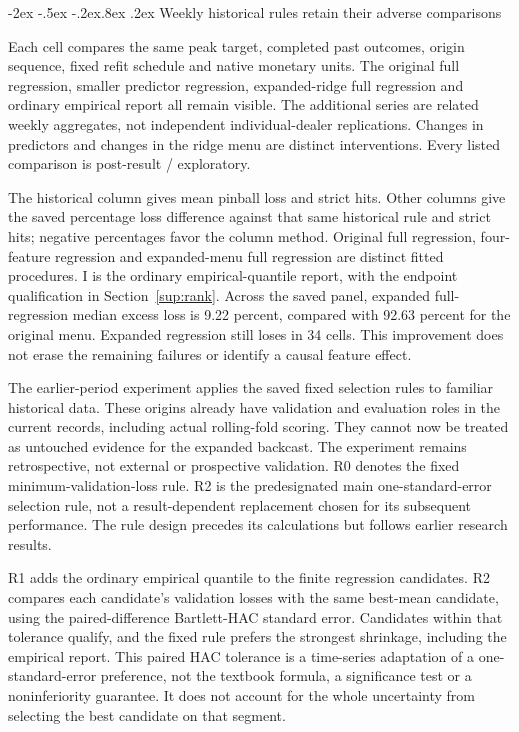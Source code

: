 \documentclass[12pt,a4paper]{article}
\makeatletter
\renewcommand\section{\@startsection{section}{1}{\z@}%
  {-2ex \@plus -.5ex \@minus -.2ex}{.8ex \@plus .2ex}%
  {\normalfont\large\bfseries}}
\makeatother
\begin{document}
\FloatBarrier


\section{Weekly historical rules retain their adverse comparisons}\label{sup:panel}\label{sup:panel-second}\label{sup:panel-levy}\label{sup:selection}\label{sup:selection-failures}

Each cell compares the same peak target, completed past outcomes,
origin sequence, fixed refit schedule and native monetary units. The original
full regression, smaller predictor regression, expanded-ridge full regression
and ordinary empirical report all remain visible. The additional series are
related weekly aggregates, not independent individual-dealer replications.
Changes in predictors and changes in the ridge menu are distinct interventions.
Every listed comparison is post-result / exploratory.

The historical column gives mean pinball loss and strict hits. Other columns
give the saved percentage loss difference against that same historical rule and
strict hits; negative percentages favor the column method. Original full
regression, four-feature regression and expanded-menu full regression are
distinct fitted procedures.
I is the ordinary
empirical-quantile report, with the endpoint qualification in Section~\ref{sup:rank}.
Across the saved panel, expanded full-regression median excess
loss is 9.22 percent,
compared with 92.63 percent for the original menu. Expanded regression still loses in 34 cells.
This improvement does not erase the remaining failures or identify a causal
feature effect.

The earlier-period experiment applies the saved fixed selection rules
to familiar historical data. These origins already have validation and
evaluation roles in the current records, including actual rolling-fold
scoring. They cannot now be treated as untouched evidence for the expanded
backcast. The experiment remains retrospective, not external or prospective
validation. R0 denotes the fixed minimum-validation-loss rule. R2 is the predesignated main one-standard-error selection rule,
not a result-dependent replacement chosen for its subsequent performance.
The rule design precedes its calculations but follows earlier research results.

R1 adds the ordinary empirical quantile to the finite regression candidates.
R2 compares each candidate's validation losses with the same best-mean
candidate, using the paired-difference Bartlett-HAC standard error. Candidates
within that tolerance qualify, and the fixed rule prefers the strongest
shrinkage, including the empirical report. This paired HAC tolerance is a
time-series adaptation of a one-standard-error preference, not the textbook
formula, a significance test or a noninferiority guarantee. It does not account
for the whole uncertainty from selecting the best candidate on that segment.
\end{document}
